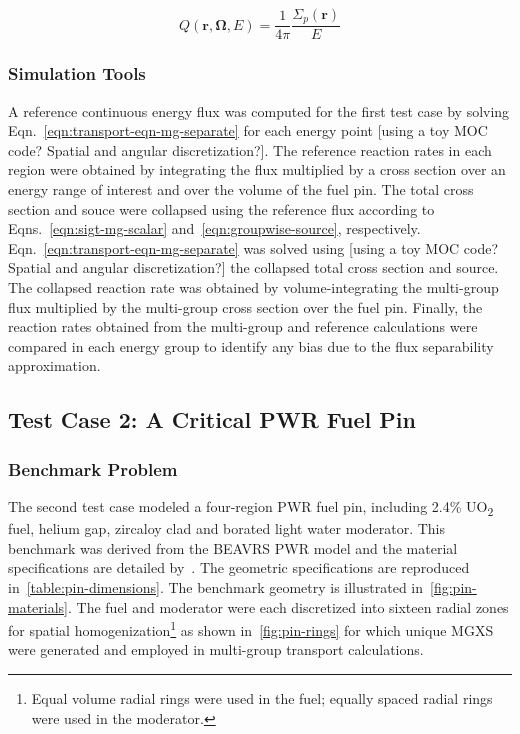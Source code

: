 \begin{dmath}
\label{eqn:test-source-ce}
Q(\mathbf{r},\mathbf{\Omega},E) = \frac{1}{4\pi} \frac{\Sigma_{p}(\mathbf{r})}{E}
\end{dmath}


\subsubsection{Simulation Tools}
\label{subsubsec:sim-tools-case1}

A reference continuous energy flux was computed for the first test case by solving Eqn.~\ref{eqn:transport-eqn-mg-separate} for each energy point {\color{red}[using a toy MOC code? Spatial and angular discretization?]}. The reference reaction rates in each region were obtained by integrating the flux multiplied by a cross section over an energy range of interest and over the volume of the fuel pin. The total cross section and souce were collapsed using the reference flux according to Eqns.~\ref{eqn:sigt-mg-scalar} and~\ref{eqn:groupwise-source}, respectively. Eqn.~\ref{eqn:transport-eqn-mg-separate} was solved using {\color{red}[using a toy MOC code? Spatial and angular discretization?]} the collapsed total cross section and source. The collapsed reaction rate was obtained by volume-integrating the multi-group flux multiplied by the multi-group cross section over the fuel pin. Finally, the reaction rates obtained from the multi-group and reference calculations were compared in each energy group to identify any bias due to the flux separability approximation.


\subsection{Test Case 2: A Critical PWR Fuel Pin}
\label{subsec:test-case2}

\subsubsection{Benchmark Problem}
\label{subsubsec:benchmark-case2}

The second test case modeled a four-region PWR fuel pin, including  2.4\% UO\textsubscript{2} fuel, helium gap, zircaloy clad and borated light water moderator. This benchmark was derived from the BEAVRS PWR model and the material specifications are detailed by~\cite{horelik2013beavrs}. The geometric specifications are reproduced in~\autoref{table:pin-dimensions}. The benchmark geometry is illustrated in~\autoref{fig:pin-materials}. The fuel and moderator were each discretized into sixteen radial zones for spatial homogenization\footnote{Equal volume radial rings were used in the fuel; equally spaced radial rings were used in the moderator.} as shown in~\autoref{fig:pin-rings} for which unique MGXS were generated and employed in multi-group transport calculations.

